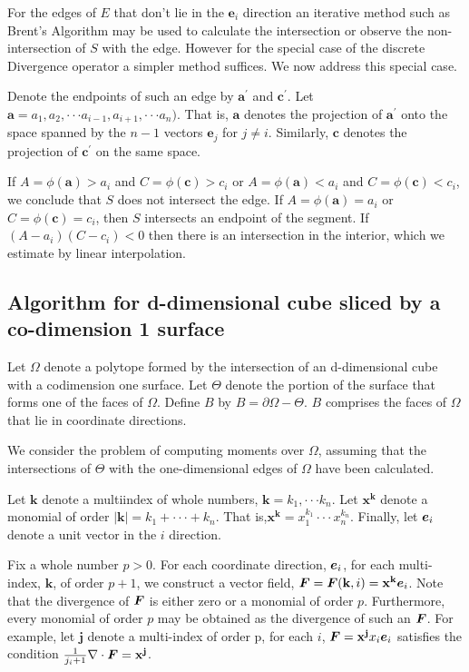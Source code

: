 For the edges of $E$ that don't lie in the $\mathbf{e}_{i}$ direction an iterative method such as Brent's Algorithm may be used to calculate the intersection or observe the non-intersection of $S$ with the edge. However for the special case of the discrete Divergence operator a simpler method suffices. We now address this special case.

Denote the endpoints of such an edge by $\mathbf {a^\prime}$ and $\mathbf {c^\prime}$. Let $\mathbf {a} = 
a_{1},a_{2}, \cdot \cdot \cdot a_{i-1},a_{i+1}, \cdot \cdot \cdot a_{n})$. That is, $\mathbf {a}$ denotes the projection of $\mathbf {a^\prime}$ onto the space spanned by the $n-1$ vectors $\mathbf{e}_{j}$ for $j\neq i $. Similarly, $\mathbf {c}$ denotes the projection of $\mathbf {c^\prime}$ on the same space.

If $A=\phi(\mathbf a) > a_{i}$ and $C=\phi(\mathbf c) > c_{i}$ or $A=\phi(\mathbf a) < a_{i}$ and $C=\phi(\mathbf c) < c_{i}$, we conclude that $S$ does not intersect the edge. If $A=\phi(\mathbf a) = a_{i}$ or $C=\phi(\mathbf c) = c_{i}$, then $S$ intersects an endpoint of the segment. If $(A - a_{i})(C-c_{i})<0$ then there is an intersection in the interior, which we estimate by linear interpolation.

\subsection{Algorithm for {\bf{d}}-dimensional cube sliced by a co-dimension {\bf{1}} surface }

Let $\Omega$ denote a polytope formed by the intersection of an d-dimensional cube with a codimension one surface. Let $\Theta$ denote the portion of the surface that forms one of the faces of $\Omega$. Define $B$ by $B = \partial \Omega - \Theta$. $B$ comprises the faces of $\Omega$ that lie in coordinate directions.

We consider the problem of computing moments over $\Omega$, assuming that the intersections of $\Theta$ with the one-dimensional edges of $\Omega$ have been calculated. 

Let $\mathbf{k}$ denote a multiindex of whole numbers, $\mathbf{k} = k_{1},\cdot \cdot \cdot k_{n}$. Let $\mathbf{x}^{\mathbf k}$ denote a monomial of order $|\mathbf{k}| = k_{1}+ \cdot \cdot \cdot + k_{n}$. That is,$\mathbf{x}^{\mathbf k}=  x_{1}^{k_{1}}\cdot \cdot \cdot x_{n}^{k_{n}}$. Finally, let ${\mbox{\boldmath $e$}}_{i}$ denote a unit vector in the $i$ direction.

Fix a whole number $p > 0$.  For each coordinate direction, ${\mbox{\boldmath $e$}}_{i}$, for each multi-index, $\mathbf{k}$, of order $p+1$, we construct a vector field, $\mbox{\boldmath $F$} = \mbox{\boldmath $F$}(\mathbf{k},i) =  \mathbf{x}^{\mathbf k}{\mbox{\boldmath $e$}}_{i}$. Note that the divergence of $\mbox{\boldmath $F$}$ is either zero or a monomial of order $p$. Furthermore, every monomial of order $p$ may be obtained as the divergence of such an $\mbox{\boldmath $F$}$. For example, let $\mathbf{j}$ denote a multi-index of order p, for each $i$, $\mbox{\boldmath $F$} = \mathbf{x}^{\mathbf j}x_{i}{\mbox{\boldmath $e$}}_{i}$ satisfies the condition $\frac{1}{j_{i}+1}\nabla \cdot \mbox{\boldmath $F$} =\mathbf{x}^{\mathbf j}$.

